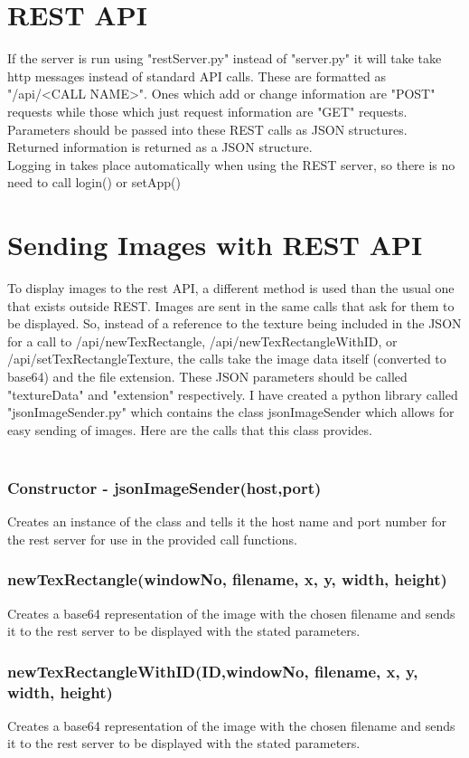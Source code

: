 \documentclass{acm_proc_article-sp}
\begin{document}
\section{REST API}
If the server is run using "restServer.py" instead of "server.py" it will take take http messages instead of standard API calls. These are formatted as "/api/<CALL NAME>". Ones which add or change information are "POST" requests while those which just request information are "GET" requests. Parameters should be passed into these REST calls as JSON structures. Returned information is returned as a JSON structure.\\
Logging in takes place automatically when using the REST server, so there is no need to call login() or setApp()
\section{Sending Images with REST API}
To display images to the rest API, a different method is used than the usual one that exists outside REST. Images are sent in the same calls that ask for them to be displayed. So, instead of a reference to the texture being included in the JSON for a call to /api/newTexRectangle, /api/newTexRectangleWithID, or /api/setTexRectangleTexture, the calls take the image data itself (converted to base64) and the file extension. These JSON parameters should be called "textureData" and "extension" respectively. I have created a python library called "jsonImageSender.py" which contains the class jsonImageSender which allows for easy sending of images. Here are the calls that this class provides.\\\\
\subsubsection{Constructor - jsonImageSender(host,port)}
Creates an instance of the class and tells it the host name and port number for the rest server for use in the provided call functions.
\subsubsection{newTexRectangle(windowNo, filename, x, y, width, height)}
Creates a base64 representation of the image with the chosen filename and sends it to the rest server to be displayed with the stated parameters.
\subsubsection{newTexRectangleWithID(ID,windowNo, filename, x, y, width, height)}
Creates a base64 representation of the image with the chosen filename and sends it to the rest server to be displayed with the stated parameters.
\end{document}

